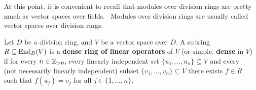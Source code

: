 %
%



At this point, it is convenient to recall that
modules over division rings are pretty much as vector spaces over fields. 
Modules over division rings are usually called vector spaces over division rings. 

\begin{definition}
	Let $D$ be a division ring, and $V$ be a vector space over $D$. A subring 
	$R\subseteq\operatorname{End}_D(V)$ is a \textbf{dense ring of linear operators} 
	of $V$ (or simple, \textbf{dense} in $V$) if for every  
	$n\in\mathbb{Z}_{>0}$, every linearly independent set $\{u_1,\dots,u_n\}\subseteq V$ 
	and every (not necessarily linearly independent) subset $\{v_1,\dots,v_n\}\subseteq V$ 
	there exists $f\in R$ such that $f(u_j)=v_j$ for all 
	$j\in\{1,\dots,n\}$.
\end{definition}

